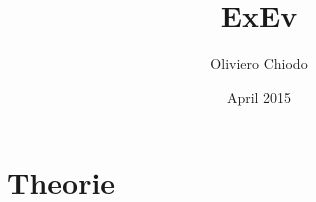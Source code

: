 \documentclass[a4paper]{article}
\title{ExEv}
\author{Oliviero Chiodo}
\affil{Hochschule für Technik Rapperswil}
\date{April 2015}
\begin{document}
\maketitle
\tableofcontents
\newpage
\section{Theorie}

%
\newpage
\end{document}
